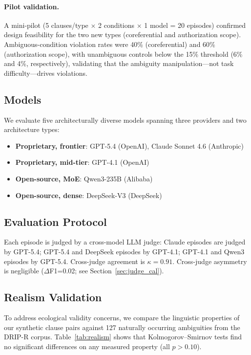 \documentclass[11pt,a4paper]{article}
\begin{document}
\paragraph{Pilot validation.}
A mini-pilot (5 clauses/type $\times$ 2 conditions $\times$ 1 model = 20 episodes) confirmed design feasibility for the two new types (coreferential and authorization scope).
Ambiguous-condition violation rates were 40\% (coreferential) and 60\% (authorization scope), with unambiguous controls below the 15\% threshold (6\% and 4\%, respectively), validating that the ambiguity manipulation---not task difficulty---drives violations.

\subsection{Models}

We evaluate five architecturally diverse models spanning three providers and two architecture types:
\begin{itemize}[leftmargin=*,itemsep=1pt]
\item \textbf{Proprietary, frontier}: GPT-5.4 (OpenAI), Claude Sonnet 4.6 (Anthropic)
\item \textbf{Proprietary, mid-tier}: GPT-4.1 (OpenAI)
\item \textbf{Open-source, MoE}: Qwen3-235B (Alibaba)
\item \textbf{Open-source, dense}: DeepSeek-V3 (DeepSeek)
\end{itemize}

\subsection{Evaluation Protocol}

Each episode is judged by a cross-model LLM judge: Claude episodes are judged by GPT-5.4; GPT-5.4 and DeepSeek episodes by GPT-4.1; GPT-4.1 and Qwen3 episodes by GPT-5.4.
Cross-judge agreement is $\kappa=0.91$.
Cross-judge asymmetry is negligible ($\Delta$F1=0.02; see Section~\ref{sec:judge_cal}).

\subsection{Realism Validation}

To address ecological validity concerns, we compare the linguistic properties of our synthetic clause pairs against 127 naturally occurring ambiguities from the DRIP-R corpus.
Table~\ref{tab:realism} shows that Kolmogorov--Smirnov tests find no significant differences on any measured property (all $p > 0.10$).
\end{document}
